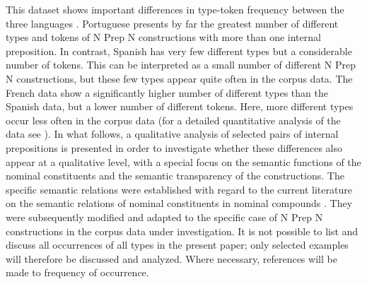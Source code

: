 \documentclass[output=paper]{langsci/langscibook}
\begin{document}
This dataset shows important differences in type-token frequency between the three languages \citep{Hennecke:2017}. Portuguese presents by far the greatest number of different types and tokens of N Prep N constructions with more than one internal preposition. In contrast, Spanish has very few different types but a considerable number of tokens. This can be interpreted as a small number of different N Prep N constructions, but these few types appear quite often in the corpus data. The French data show a significantly higher number of different types than the Spanish data, but a lower number of different tokens. Here, more different types occur less often in the corpus data (for a detailed quantitative analysis of the data see \citealt{Hennecke:2017}). In what follows, a qualitative analysis of selected pairs of internal prepositions is presented in order to investigate whether these differences also appear at a qualitative level, with a special focus on the semantic functions of the nominal constituents and the semantic transparency of the constructions. The specific semantic relations were established with regard to the current literature on the semantic relations of nominal constituents in nominal compounds \citep{Gagne:1997, Gagne:2009, Girju:2005}. They were subsequently modified and adapted to the specific case of N Prep N constructions in the corpus data under investigation. It is not possible to list and discuss all occurrences of all types in the present paper; only selected examples will therefore be discussed and analyzed. Where necessary, references will be made to frequency of occurrence. 
\end{document}
